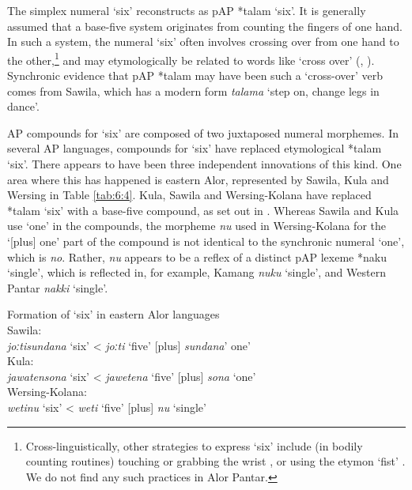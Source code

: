 The simplex numeral `six' reconstructs as pAP *talam `six'. It is generally assumed that a base-five system originates from counting the fingers of one hand. In such a system, the numeral `six' often involves crossing over from one hand to the other,\footnote{Cross-linguistically, other strategies to express `six' include (in bodily counting routines) touching or grabbing the wrist \citep{Evans2009,Donohue2008num}, or using the etymon `fist' \citep[343]{Plank2009}. We do not find any such practices in Alor Pantar.} and may etymologically be related to words like `cross over' (\citealt{Majewicz1981,Majewicz1984}, \citealt[399-401]{Lynch2009}). Synchronic evidence that pAP *talam may have been such a `cross-over' verb comes from Sawila, which has a modern form \textit{talama{\ng}} `step on, change legs in dance'. 

AP compounds for `six' are composed of two juxtaposed numeral morphemes. In several AP languages, compounds for `six' have replaced etymological *talam `six'. There appears to have been three independent innovations of this kind. One area where this has happened is eastern Alor, represented by Sawila, Kula and Wersing in Table \ref{tab:6:4}. Kula, Sawila and Wersing-Kolana have replaced *talam `six' with a base-five compound, as set out in . Whereas Sawila and Kula use `one' in the compounds, the morpheme \textit{nu}\textit{{\ng}} used in Wersing-Kolana for the `[plus] one' part of the compound is not identical to the synchronic numeral `one', which is \textit{no}. Rather, \textit{nu}\textit{{\ng}} appears to be a reflex of a distinct pAP lexeme *naku{\ng} `single', which is reflected in, for example, Kamang \textit{nuku}\textit{{\ng}} `single', and Western Pantar \textit{nakki}\textit{{\ng}} `single'.



\ea%
\label{ex:6:4}
\upshape Formation of `six' in eastern Alor languages\\
 Sawila:\\
 \textit{joːti}\textit{{\ng}}\textit{sundana}\textbf{}   `six'   {\textless} \textit{joːti}\textit{{\ng}} `five'   [plus] \textit{sundana}' one'\\
   Kula:\\
   \textit{jawatensona}\textbf{}   `six'   {\textless} \textit{jawetena} `five' [plus] \textit{sona} `one'    \\
   Wersing-Kolana:\\   \textit{weti}\textit{{\ng}}\textit{nu}\textit{{\ng}}  `six'   {\textless} \textit{weti}\textit{{\ng}} `five'   [plus] \textit{nu}\textit{{\ng}} `single'    \\ 
\z

